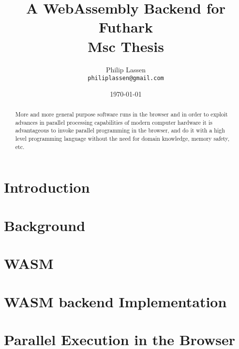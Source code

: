 \documentclass[11pt]{article}
\title{
  \vspace{3cm}
  \Huge{A WebAssembly Backend for Futhark} \\
  \Large{Msc Thesis}
}
\author{
  \Large{Philip Lassen}
  \\ \texttt{philiplassen@gmail.com} \\
}
\date{
    \today
}
\def \ColourPDF {include/natbio-farve}
\def \TitlePDF   {include/nat-en}  %
\begin{document}


\clearpage\maketitle
\thispagestyle{empty}

\newpage


\begin{abstract}
More and more general purpose software runs in the browser and in order to exploit advances in parallel processing capabilities of modern computer hardware it is advantageous to invoke parallel programming in the browser, and do it with a high level programming language without the need for domain knowledge, memory safety, etc.
\end{abstract}


\newpage
\tableofcontents
\newpage

\section{Introduction}

\section{Background}

\section{WASM}

\newpage


\section{WASM backend Implementation}

\newpage





\section{Parallel Execution in the Browser}
\end{document}
